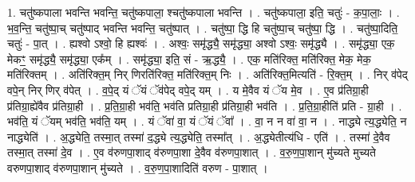 \documentclass[17pt]{extarticle}
\begin{document}
1. चतु॑ष्कपाला भवन्ति भवन्ति॒ चतु॑ष्कपाला॒ श्चतु॑ष्कपाला भवन्ति । . चतु॑ष्कपाला॒ इति॒ चतुः॑ - क॒पा॒लाः॒ । . भ॒व॒न्ति॒ चतु॑ष्पा॒च् चतु॑ष्पाद् भवन्ति भवन्ति॒ चतु॑ष्पात् । . चतु॑ष्पा॒ द्धि हि चतु॑ष्पा॒च् चतु॑ष्पा॒ द्धि । . चतु॑ष्पा॒दिति॒ चतुः॑ - पा॒त् । . ह्यश्वो ऽश्वो॒ हि ह्यश्वः॑ । . अश्वः॒ समृ॑द्ध्यै॒ समृ॑द्ध्या॒ अश्वो ऽश्वः॒ समृ॑द्ध्यै । . समृ॑द्ध्या॒ एक॒ मेकꣳ॒॒ समृ॑द्ध्यै॒ समृ॑द्ध्या॒ एक᳚म् । . समृ॑द्ध्या॒ इति॒ सं - ऋ॒द्ध्यै॒ । . एक॒ मति॑रिक्त॒ मति॑रिक्त॒ मेक॒ मेक॒ मति॑रिक्तम् । . अति॑रिक्त॒म् निर् णिरति॑रिक्त॒ मति॑रिक्त॒म् निः । . अति॑रिक्त॒मित्यति॑ - रि॒क्त॒म् । . निर् व॑पेद् वपे॒न् निर् णिर् व॑पेत् । . व॒पे॒द् यं ॅयं ॅव॑पेद् वपे॒द् यम् । . य मे॒वैव यं ॅय मे॒व । . ए॒व प्र॑तिग्रा॒ही प्र॑तिग्रा॒ह्ये॑वैव प्र॑तिग्रा॒ही । . प्र॒ति॒ग्रा॒ही भव॑ति॒ भव॑ति प्रतिग्रा॒ही प्र॑तिग्रा॒ही भव॑ति । . प्र॒ति॒ग्रा॒हीति॑ प्रति - ग्रा॒ही । . भव॑ति॒ यं ॅयम् भव॑ति॒ भव॑ति॒ यम् । . यं ॅवा॑ वा॒ यं ॅयं ॅवा᳚ । . वा॒ न न वा॑ वा॒ न । . नाद्ध्ये त्य॒द्ध्येति॒ न नाद्ध्येति॑ । . अ॒द्ध्येति॒ तस्मा॒त् तस्मा॑ द॒द्ध्ये त्य॒द्ध्येति॒ तस्मा᳚त् । . अ॒द्ध्येतीत्य॑धि - एति॑ । . तस्मा॑ दे॒वैव तस्मा॒त् तस्मा॑ दे॒व । . ए॒व व॑रुणपा॒शाद् व॑रुणपा॒शा दे॒वैव व॑रुणपा॒शात् । . व॒रु॒ण॒पा॒शान् मु॑च्यते मुच्यते वरुणपा॒शाद् व॑रुणपा॒शान् मु॑च्यते । . व॒रु॒ण॒पा॒शादिति॑ वरुण - पा॒शात् । \newline
\end{document}
